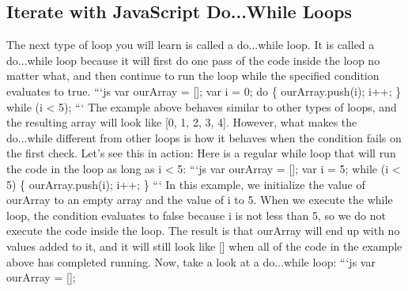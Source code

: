 \documentclass{article}%
\begin{document}
%
\subsection{Iterate with JavaScript Do...While Loops}%
\label{subsec:IteratewithJavaScriptDo...WhileLoops}%
The next type of loop you will learn is called a do...while loop.  It is called a do...while loop because it will first do one pass of the code inside the loop no matter what, and then continue to run the loop while the specified condition evaluates to true.\newline%
```js\newline%
var ourArray = {[}{]};\newline%
var i = 0;\newline%
do \{\newline%
  ourArray.push(i);\newline%
  i++;\newline%
\} while (i < 5);\newline%
```\newline%
The example above behaves similar to other types of loops, and the resulting array will look like {[}0, 1, 2, 3, 4{]}. However, what makes the do...while different from other loops is how it behaves when the condition fails on the first check. Let's see this in action:\newline%
Here is a regular while loop that will run the code in the loop as long as i < 5:\newline%
```js\newline%
var ourArray = {[}{]}; \newline%
var i = 5;\newline%
while (i < 5) \{\newline%
  ourArray.push(i);\newline%
  i++;\newline%
\}\newline%
```\newline%
In this example, we initialize the value of ourArray to an empty array and the value of i to 5. When we execute the while loop, the condition evaluates to false because i is not less than 5, so we do not execute the code inside the loop. The result is that ourArray will end up with no values added to it, and it will still look like {[}{]} when all of the code in the example above has completed running.\newline%
Now, take a look at a do...while loop:\newline%
```js\newline%
var ourArray = {[}{]}; \newline%
\end{document}
